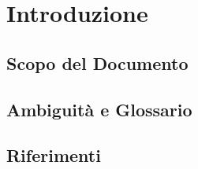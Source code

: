 \section{Introduzione}

\subsection{Scopo del Documento}

\subsection{Ambiguità e Glossario}

\subsection{Riferimenti}